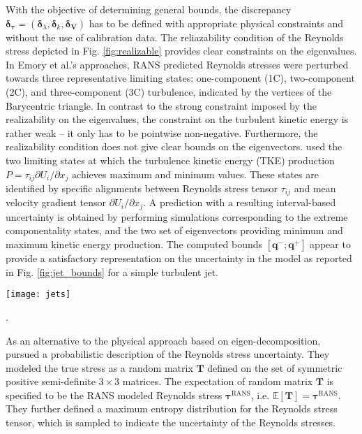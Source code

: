 \documentclass[a4paper]{ar-1col}
\begin{document}
With the objective of determining general bounds, 
 the discrepancy $ \boldsymbol{\delta}_{\bm{\tau}} = (\boldsymbol{\delta}_{\lambda},\boldsymbol{\delta}_k,\boldsymbol{\delta}_\mathbf{V} )$  has to be defined with  appropriate physical constraints and without the use of calibration data.
The reliazability condition of the Reynolds stress  depicted in Fig. \ref{fig:realizable} provides clear constraints on the eigenvalues.
In Emory et al.'s approaches, RANS predicted Reynolds stresses were perturbed towards three representative limiting states: one-component (1C), two-component (2C), and three-component (3C) turbulence, indicated by the vertices of the Barycentric triangle. 
In contrast to the strong constraint imposed by the realizability on the eigenvalues, the constraint on the turbulent kinetic energy is rather weak -- it only has to be pointwise non-negative. Furthermore, the realizability condition does not give  clear bounds on the eigenvectors. 
\citet{iaccarino2017eigenspace} used the two limiting states at which the turbulence kinetic energy (TKE) production \(P = \tau_{ij} {\partial U_i}/{\partial x_j}\)
achieves maximum and minimum values. These states  are identified by specific alignments between Reynolds stress tensor $\tau_{ij}$ and mean velocity gradient tensor ${\partial U_i}/{\partial x_j}$. 
A prediction with a resulting interval-based uncertainty is obtained by performing simulations corresponding to the extreme componentality states, and the two set of eigenvectors providing minimum and maximum kinetic energy production. The computed bounds $[\mathbf{q}^-; \mathbf{q}^+ ]$ appear to provide a satisfactory representation on the uncertainty in the model as reported in Fig. \ref{fig:jet_bounds} for a simple turbulent jet.

\begin{figure*}
\centering
\texttt{[image: jets]}
\caption{Prediction bounds for the velocity profiles in a turbulent jet computed using the eigenspace perturbations \citep{mishra2017jets}. The line represent the prediction using an eddy viscosity model, the symbols are the experimental measurements and the grey areas are the computed uncertainty bounds.}.
\label{fig:jet_bounds}
\end{figure*}


As an alternative to the physical approach based on eigen-decomposition, \citet{xiao2017random} pursued a probabilistic description of the Reynolds stress uncertainty. They modeled the true  stress as a random matrix $\bm{T}$ defined on the set 
of symmetric positive semi-definite $3 \times 3$ matrices. The expectation of random matrix $\bm{T}$ is specified to be the RANS modeled Reynolds stress $\bm{\tau}^{\text{RANS}}$, i.e.  \(\mathbb{E}[\bm{T}] = \bm{\tau}^{\text{RANS}}\).
They further defined a maximum entropy distribution for the Reynolds stress tensor, which is sampled to indicate the uncertainty of the Reynolds stresses.
\end{document}
